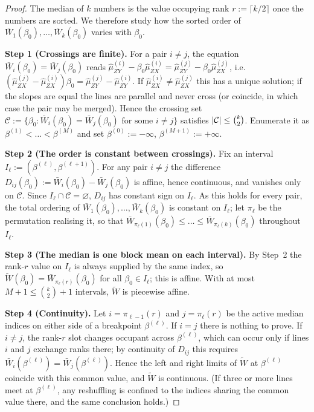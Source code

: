 \begin{proof}
The median of $k$ numbers is the value occupying rank $r:=\lceil k/2\rceil$ once the numbers are sorted. We therefore study how the sorted order of $\bar{W}_1(\beta_0),\dots,\bar{W}_k(\beta_0)$ varies with $\beta_0$.
 
\medskip\noindent\textbf{Step 1 (Crossings are finite).} For a pair $i\neq j$, the equation $\bar{W}_i(\beta_0)=\bar{W}_j(\beta_0)$ reads $\hat{\mu}_{ZY}^{(i)}-\beta_0\hat{\mu}_{ZX}^{(i)} =\hat{\mu}_{ZY}^{(j)}-\beta_0\hat{\mu}_{ZX}^{(j)}$, i.e.\ $(\hat{\mu}_{ZX}^{(j)}-\hat{\mu}_{ZX}^{(i)})\beta_0 =\hat{\mu}_{ZY}^{(j)}-\hat{\mu}_{ZY}^{(i)}$. If $\hat{\mu}_{ZX}^{(i)}\neq\hat{\mu}_{ZX}^{(j)}$ this has a unique solution; if the slopes are equal the lines are parallel and never cross (or coincide, in which case the pair may be merged). Hence the crossing set $\mathcal{C}:=\{\beta_0 : \bar{W}_i(\beta_0)=\bar{W}_j(\beta_0)\text{ for some } i\neq j\}$ satisfies $\left|\mathcal{C}\right|\le\binom{k}{2}$. Enumerate it as $\beta^{(1)}<\dots<\beta^{(M)}$ and set $\beta^{(0)}:=-\infty$, $\beta^{(M+1)}:=+\infty$.
 
\medskip\noindent\textbf{Step 2 (The order is constant between crossings).} Fix an interval $I_\ell:=(\beta^{(\ell)},\beta^{(\ell+1)})$. For any pair $i\neq j$ the difference $D_{ij}(\beta_0):=\bar{W}_i(\beta_0)-\bar{W}_j(\beta_0)$ is affine, hence continuous, and vanishes only on $\mathcal{C}$. Since $I_\ell\cap\mathcal{C}=\varnothing$, $D_{ij}$ has constant sign on $I_\ell$. As this holds for every pair, the total ordering of $\bar{W}_1(\beta_0),\dots,\bar{W}_k(\beta_0)$ is constant on $I_\ell$; let $\pi_\ell$ be the permutation realising it, so that $\bar{W}_{\pi_\ell(1)}(\beta_0)\le\dots\le\bar{W}_{\pi_\ell(k)}(\beta_0)$ throughout $I_\ell$.
 
\medskip\noindent\textbf{Step 3 (The median is one block mean on each interval).} By Step~2 the rank-$r$ value on $I_\ell$ is always supplied by the same index, so $\widetilde{W}(\beta_0)=\bar{W}_{\pi_\ell(r)}(\beta_0)$ for all $\beta_0\in I_\ell$; this is affine. With at most $M+1\le\binom{k}{2}+1$ intervals, $\widetilde{W}$ is piecewise affine.
 
\medskip\noindent\textbf{Step 4 (Continuity).} Let $i=\pi_{\ell-1}(r)$ and $j=\pi_\ell(r)$ be the active median indices on either side of a breakpoint $\beta^{(\ell)}$. If $i=j$ there is nothing to prove. If $i\neq j$, the rank-$r$ slot changes occupant across $\beta^{(\ell)}$, which can occur only if lines $i$ and $j$ exchange ranks there; by continuity of $D_{ij}$ this requires $\bar{W}_i(\beta^{(\ell)})=\bar{W}_j(\beta^{(\ell)})$. Hence the left and right limits of $\widetilde{W}$ at $\beta^{(\ell)}$ coincide with this common value, and $\widetilde{W}$ is continuous. (If three or more lines meet at $\beta^{(\ell)}$, any reshuffling is confined to the indices sharing the common value there, and the same conclusion holds.)
\end{proof}


